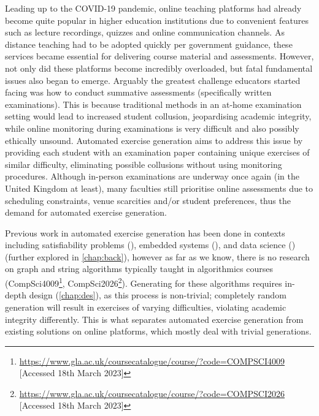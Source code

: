 \documentclass{l4proj}
\begin{document}
Leading up to the COVID-19 pandemic, online teaching platforms had already become quite popular in higher education institutions due to convenient features such as lecture recordings, quizzes and online communication channels. As distance teaching had to be adopted quickly per government guidance, these services became essential for delivering course material and assessments. However, not only did these platforms become incredibly overloaded, but fatal fundamental issues also began to emerge. Arguably the greatest challenge educators started facing was how to conduct summative assessments (specifically written examinations). This is because traditional methods in an at-home examination setting would lead to increased student collusion, jeopardising academic integrity, while online monitoring during examinations is very difficult and also possibly ethically unsound. Automated exercise generation aims to address this issue by providing each student with an examination paper containing unique exercises of similar difficulty, eliminating possible collusions without using  monitoring procedures. Although in-person examinations are underway once again (in the United Kingdom at least), many faculties still prioritise online assessments due to scheduling constraints, venue scarcities and/or student preferences, thus the demand for automated exercise generation.

Previous work in automated exercise generation has been done in contexts including satisfiability problems (\cite{Hoz21}), embedded systems  (\cite{Sad12}), and data science (\cite{Kot19}) (further explored in \autoref{chap:back}), however as far as we know, there is no research on graph and string algorithms typically taught in algorithmics courses (CompSci4009\footnote{\url{https://www.gla.ac.uk/coursecatalogue/course/?code=COMPSCI4009} [Accessed 18th March 2023]}, CompSci2026\footnote{\url{https://www.gla.ac.uk/coursecatalogue/course/?code=COMPSCI2026} [Accessed 18th March 2023]}). Generating for these algorithms requires in-depth design (\autoref{chap:des}), as this process is non-trivial; completely random generation will result in exercises of varying difficulties, violating academic integrity differently. This is what separates automated exercise generation from existing solutions on online platforms, which mostly deal with trivial generations.
\end{document}

